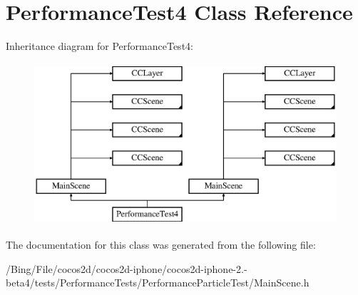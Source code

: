 \hypertarget{interface_performance_test4}{\section{Performance\-Test4 Class Reference}
\label{interface_performance_test4}
}
Inheritance diagram for Performance\-Test4\-:\begin{figure}[H]
\begin{center}
\leavevmode
\includegraphics[height=6.000000cm]{interface_performance_test4}
\end{center}
\end{figure}


The documentation for this class was generated from the following file\-:\begin{DoxyCompactItemize}
\item 
/\-Bing/\-File/cocos2d/cocos2d-\/iphone/cocos2d-\/iphone-\/2.-\/beta4/tests/\-Performance\-Tests/\-Performance\-Particle\-Test/Main\-Scene.\-h\end{DoxyCompactItemize}
